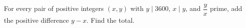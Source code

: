 For every pair of positive integers $(x,y)$ with $y\mid3600$, $x\mid y$, and $\dfrac{y}{x}$ prime, add the positive difference $y-x$. Find the total.
